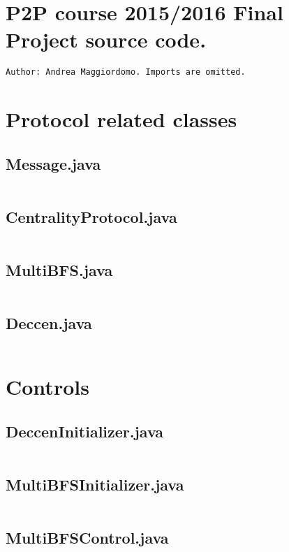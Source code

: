 \documentclass[a4paper, 10pt]{article}
\begin{document}
\section*{P2P course 2015/2016 Final Project source code.}
\begin{verbatim}
Author: Andrea Maggiordomo. Imports are omitted.
\end{verbatim}

\section{Protocol related classes}

\subsection*{Message.java}
\inputminted[firstline=16]{java}{../src/centrality/Message.java}
\subsection*{CentralityProtocol.java}
\inputminted[firstline=20]{java}{../src/centrality/CentralityProtocol.java}
\subsection*{MultiBFS.java}
\inputminted[firstline=25]{java}{../src/centrality/MultiBFS.java}
\subsection*{Deccen.java}
\inputminted[firstline=24]{java}{../src/centrality/Deccen.java}

\section{Controls}

\subsection*{DeccenInitializer.java}
\inputminted[firstline=16]{java}{../src/centrality/DeccenInitializer.java}
\subsection*{MultiBFSInitializer.java}
\inputminted[firstline=21]{java}{../src/centrality/MultiBFSInitializer.java}
\subsection*{MultiBFSControl.java}
\inputminted[firstline=21]{java}{../src/centrality/MultiBFSControl.java}
\end{document}
